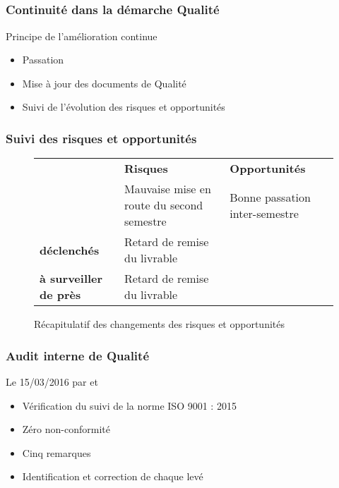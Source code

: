 
\speaker{\Pierre}

\subsection{} %


\begin{frame}
\frametitle{Continuité dans la démarche Qualité}
\begin{block}{Principe de l'amélioration continue}
\begin{itemize}
\item Passation 
\item Mise à jour des documents de Qualité
\item Suivi de l'évolution des risques et opportunités
\end{itemize}
\end{block}
\end{frame}




\begin{frame}
\frametitle{Suivi des risques et opportunités}
\begin{figure}
\begin{longtable}{|p{1.8cm}||p{3.5cm}|p{3.5cm}|}
\hline
 & \textbf{Risques} & \textbf{Opportunités} \\\hhline{|=||=|=|}
\multirow{1}{*}{\textbf{clôturés}} & \small Mauvaise mise en route du second semestre & \small Bonne passation inter-semestre \\\hline

\multirow{1}{*}{\textbf{déclenchés}} & \small Retard de remise du livrable & \\\hline
\multirow{1}{*}{\textbf{à surveiller de près}} & \small Retard de remise du livrable & \\\hline
\end{longtable}
\caption{Récapitulatif des changements des risques et opportunités}
\end{figure}
\end{frame}



\begin{frame}
\frametitle{Audit interne de Qualité}
\begin{block}{Le 15/03/2016 par \nomApprobateur{} et \nomTuteurQualite{}}
\begin{itemize}
\item Vérification du suivi de la norme ISO 9001 : 2015
\item Zéro non-conformité
\item Cinq remarques
\item Identification et correction de chaque \FT{} levé
\end{itemize}
\end{block}
\end{frame}





